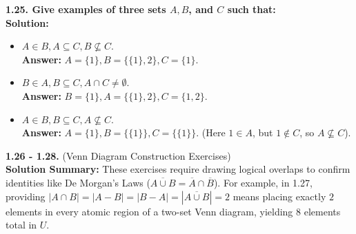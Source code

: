\documentclass[12pt]{article}
\begin{document}
\vspace{0.5cm}
\textbf{1.25. Give examples of three sets $A, B$, and $C$ such that:} \\
\textbf{Solution:}
\begin{itemize}
    \item[(a)] $A \in B, A \subseteq C, B \not\subseteq C$. \\
    \textbf{Answer:} $A = \{1\}, B = \{\{1\}, 2\}, C = \{1\}$. 
    \item[(b)] $B \in A, B \subseteq C, A \cap C \neq \emptyset$. \\
    \textbf{Answer:} $B = \{1\}, A = \{\{1\}, 2\}, C = \{1, 2\}$. 
    \item[(c)] $A \in B, B \subseteq C, A \not\subseteq C$. \\
    \textbf{Answer:} $A = \{1\}, B = \{\{1\}\}, C = \{\{1\}\}$. (Here $1 \in A$, but $1 \notin C$, so $A \not\subseteq C$).
\end{itemize}

\vspace{0.5cm}
\textbf{1.26 - 1.28.} (Venn Diagram Construction Exercises) \\
\textbf{Solution Summary:} These exercises require drawing logical overlaps to confirm identities like De Morgan's Laws ($\overline{A \cup B} = \overline{A} \cap \overline{B}$). For example, in 1.27, providing $|A \cap B| = |A - B| = |B - A| = |\overline{A \cup B}| = 2$ means placing exactly $2$ elements in every atomic region of a two-set Venn diagram, yielding $8$ elements total in $U$.
\end{document}
